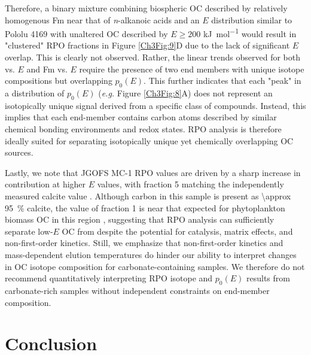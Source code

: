Therefore, a binary mixture combining biospheric OC described by relatively homogenous Fm near that of \textit{n}-alkanoic acids and an $E$ distribution similar to Pololu 4169 with unaltered OC described by $E \geq 200$ \si{kJ.mol^{-1}} would result in "clustered" RPO fractions in Figure \ref{Ch3Fig:9}D due to the lack of significant $E$ overlap. This is clearly not observed. Rather, the linear trends observed for both  vs. $E$ and Fm vs. $E$ require the presence of two end members with unique isotope compositions but overlapping $p_{0}(E)$. This further indicates that each "peak" in a distribution of $p_{0}(E)$ (\textit{e.g.} Figure \ref{Ch3Fig:8}A) does not represent an isotopically unique signal derived from a specific class of compounds. Instead, this implies that each end-member contains carbon atoms described by similar chemical bonding environments and redox states. RPO analysis is therefore ideally suited for separating isotopically unique yet chemically overlapping OC sources.

Lastly, we note that JGOFS MC-1 RPO  values are driven by a sharp increase in  contribution at higher $E$ values, with fraction 5 matching the independently measured calcite value \citep[Figure \ref{Ch3Fig:9}E;][]{Sayles:2001ua}. Although carbon in this sample is present as \SI{\approx 95}{\%} calcite, the  value of fraction 1 is near that expected for phytoplankton biomass OC in this region \citep{Rau:1989wr}, suggesting that RPO analysis can sufficiently separate low-$E$ OC from  despite the potential for catalysis, matrix effects, and non-first-order kinetics. Still, we emphasize that non-first-order kinetics and mass-dependent  elution temperatures do hinder our ability to interpret changes in OC isotope composition for carbonate-containing samples. We therefore do not recommend quantitatively interpreting RPO isotope and $p_{0}(E)$ results from carbonate-rich samples without independent constraints on end-member composition. 

\section{Conclusion}

